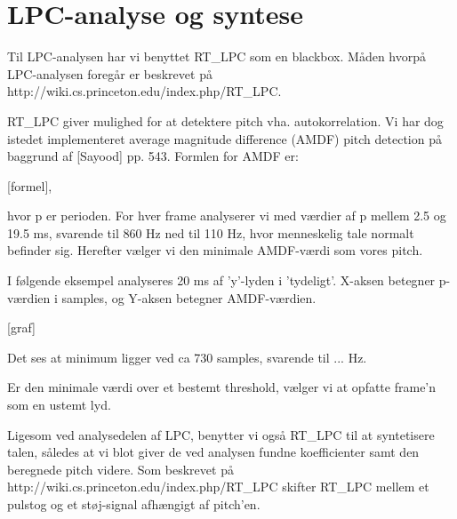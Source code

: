 \section{LPC-analyse og syntese}
Til LPC-analysen har vi benyttet RT_LPC som en blackbox. Måden hvorpå LPC-analysen foregår er beskrevet på http://wiki.cs.princeton.edu/index.php/RT_LPC.

RT_LPC giver mulighed for at detektere pitch vha. autokorrelation. Vi har dog istedet implementeret average magnitude difference (AMDF) pitch detection på baggrund af [Sayood] pp. 543. Formlen for AMDF er:

[formel],

hvor p er perioden. For hver frame analyserer vi med værdier af p mellem 2.5 og 19.5 ms, svarende til 860 Hz ned til 110 Hz, hvor menneskelig tale normalt befinder sig. Herefter vælger vi den minimale AMDF-værdi som vores pitch.

I følgende eksempel analyseres 20 ms af 'y'-lyden i 'tydeligt'. X-aksen betegner p-værdien i samples, og Y-aksen betegner AMDF-værdien.

[graf]

Det ses at minimum ligger ved ca 730 samples, svarende til ... Hz.

Er den minimale værdi over et bestemt threshold, vælger vi at opfatte frame'n som en ustemt lyd.

Ligesom ved analysedelen af LPC, benytter vi også RT_LPC til at syntetisere talen, således at vi blot giver de ved analysen fundne koefficienter samt den beregnede pitch videre. Som beskrevet på http://wiki.cs.princeton.edu/index.php/RT_LPC skifter RT_LPC mellem et pulstog og et støj-signal afhængigt af pitch'en.

